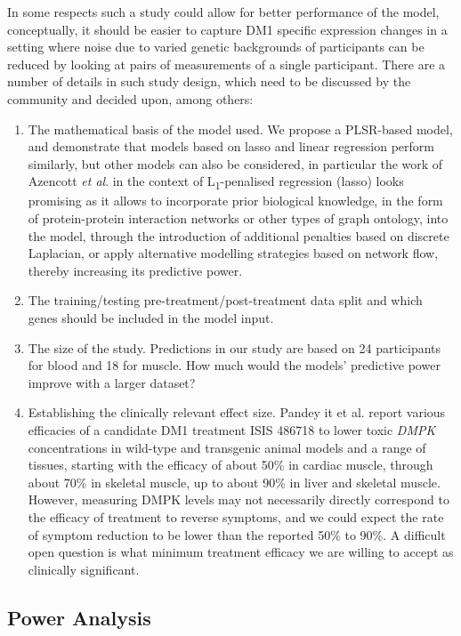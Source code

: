 \documentclass[10pt,letterpaper]{article}
\begin{document}
In some respects such a study could allow for better performance of the model, conceptually, it should be easier to capture DM1 specific expression changes in a setting where noise due to varied genetic backgrounds of participants can be reduced by looking at pairs of measurements of a single participant. There are a number of details in such study design, which need to be discussed by the community and decided upon, among others:
\begin{enumerate}
\item The mathematical basis of the model used. We propose a PLSR-based model, and demonstrate that models based on lasso and linear regression perform similarly, but other models can also be considered, in particular the work of Azencott {\it et al}. \cite{Azencott2013} in the context of L\textsubscript{1}-penalised regression (lasso) looks promising as it allows to incorporate prior biological knowledge, in the form of protein-protein interaction networks or other types of graph ontology, into the model, through the introduction of additional penalties based on discrete Laplacian, or apply alternative modelling strategies based on network flow, thereby increasing its predictive power.
\item The training/testing pre-treatment/post-treatment data split and which genes should be included in the model input.
\item The size of the study. Predictions in our study are based on 24 participants for blood and 18 for muscle. How much would the models' predictive power improve with a larger dataset?
\item Establishing the clinically relevant effect size. Pandey {
it et al.} \cite{Pandey2015} report various efficacies of a candidate DM1 treatment ISIS 486718 to lower toxic {\it DMPK} concentrations in wild-type and transgenic animal models and a range of tissues, starting with the efficacy of about 50\% in cardiac muscle, through about 70\% in skeletal muscle, up to about 90\% in liver and skeletal muscle. However, measuring DMPK levels may not necessarily directly correspond to the efficacy of treatment to reverse symptoms, and we could expect the rate of symptom reduction to be lower than the reported 50\% to 90\%. A difficult open question is what minimum treatment efficacy we are willing to accept as clinically significant.
\end{enumerate}

\subsection*{Power Analysis}
\end{document}
